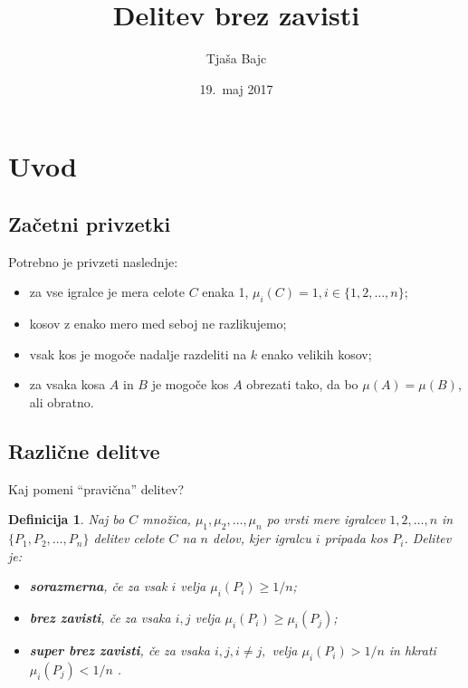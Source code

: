 \documentclass{beamer}
\title{Delitev brez zavisti}
\author{Tjaša Bajc}
\date{19.\ maj 2017}
\newtheorem{definicija}{Definicija}
\begin{document}

\begin{frame}
\titlepage
\end{frame}

\section{Uvod}
\subsection{Začetni privzetki}

\begin{frame}

Potrebno je privzeti naslednje:

\begin{itemize}
\item za vse igralce je mera celote $C$ enaka 1, $\mu_i(C) = 1, i \in \{1, 2, \ldots, n\}$;
\item kosov z enako mero med seboj ne razlikujemo; 
\item vsak kos je mogoče nadalje razdeliti na $k$ enako velikih kosov;
\item za vsaka kosa $A$ in $B$ je mogoče kos $A$ obrezati tako, da bo $\mu(A) = \mu(B)$, ali obratno.							
\end{itemize}

\end{frame}

\subsection{Različne delitve}
\begin{frame}

Kaj pomeni ``pravična'' delitev?

\begin{definicija}
Naj bo $C$ množica, $\mu_1, \mu_2, \ldots, \mu_n$ po vrsti mere igralcev $1, 2, \ldots, n$ in $\{P_1, P_2, \ldots, P_n\}$ delitev celote $C$ na $n$ delov, kjer igralcu $i$ pripada kos $P_i$. Delitev je:

\begin{itemize}
\item \textbf {\em sorazmerna}, če za vsak $i$ velja $\mu_i(P_i) \geq 1/n$;
\item \textbf {\em brez zavisti}, če za vsaka $i, j$ velja $\mu_i(P_i) \geq \mu_i(P_j)$;
\item \textbf {\em super brez zavisti}, če za vsaka $i, j, i \neq j,$ velja $\mu_i(P_i) > 1/n$ in hkrati $\mu_i(P_j) < 1/n$ .								
\end{itemize}

\end{definicija}

\end{frame}
\end{document}
